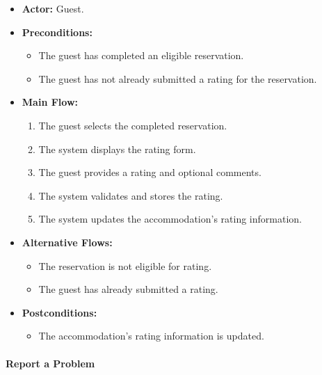 \begin{itemize}
    \item \textbf{Actor:} Guest.
    
    \item \textbf{Preconditions:}
    \begin{itemize}
        \item The guest has completed an eligible reservation.
        \item The guest has not already submitted a rating for the reservation.
    \end{itemize}
    
    \item \textbf{Main Flow:}
    \begin{enumerate}
        \item The guest selects the completed reservation.
        \item The system displays the rating form.
        \item The guest provides a rating and optional comments.
        \item The system validates and stores the rating.
        \item The system updates the accommodation's rating information.
    \end{enumerate}
    
    \item \textbf{Alternative Flows:}
    \begin{itemize}
        \item The reservation is not eligible for rating.
        \item The guest has already submitted a rating.
    \end{itemize}
    
    \item \textbf{Postconditions:}
    \begin{itemize}
        \item The accommodation's rating information is updated.
    \end{itemize}
\end{itemize}


\paragraph{Report a Problem}

